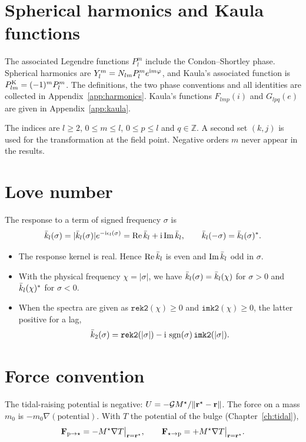 \section{Spherical harmonics and Kaula functions}
The associated Legendre functions $P_l^m$ include the Condon--Shortley phase. Spherical harmonics are $Y_l^m=N_{lm}P_l^me^{\mathrm{i} m\varphi}$, and Kaula's associated function is $P^{\mathrm K}_{lm}=(-1)^mP_l^m$. The definitions, the two phase conventions and all identities are collected in Appendix~\ref{app:harmonics}. Kaula's functions $F_{lmp}(i)$ and $G_{lpq}(e)$ are given in Appendix~\ref{app:kaula}.

The indices are $l\ge2$, $0\le m\le l$, $0\le p\le l$ and $q\in\mathbb Z$. A second set $(k,j)$ is used for the transformation at the field point. Negative orders $m$ never appear in the results.

\section{Love number}
The response to a term of signed frequency $\sigma$ is
\begin{equation}
  \bar k_l(\sigma)=|\bar k_l(\sigma)|e^{-\mathrm{i}\epsilon_l(\sigma)}=\operatorname{Re}\bar k_l+\mathrm{i}\operatorname{Im}\bar k_l,\qquad
  \bar k_l(-\sigma)=\bar k_l(\sigma)^*. \label{eq:love-def}
\end{equation}
\begin{itemize}
  \item The response kernel is real. Hence $\operatorname{Re}\bar k_l$ is even and $\operatorname{Im}\bar k_l$ odd in $\sigma$.
  \item With the physical frequency $\chi=|\sigma|$, we have $\bar k_l(\sigma)=\bar k_l(\chi)$ for $\sigma>0$ and $\bar k_l(\chi)^*$ for $\sigma<0$.
  \item When the spectra are given as $\texttt{rek2}(\chi)\ge0$ and $\texttt{imk2}(\chi)\ge0$, the latter positive for a lag,
  \begin{equation}
    \bar k_2(\sigma)=\texttt{rek2}(|\sigma|)-\mathrm{i}\,\operatorname{sgn}(\sigma)\,\texttt{imk2}(|\sigma|). \label{eq:love-spectra}
  \end{equation}
\end{itemize}

\section{Force convention}
The tidal-raising potential is negative: $U=-\mathcal{G} M^\star/\|\mathbf r^\star-\mathbf r\|$. The force on a mass $m_0$ is $-m_0\nabla(\text{potential})$. With $T$ the potential of the bulge (Chapter~\ref{ch:tidal}),
\begin{equation}
  \mathbf F_{\mathrm p\to\star}=-M^\star\nabla T\big|_{\mathbf r=\mathbf r^\star},\qquad \mathbf F_{\star\to\mathrm p}=+M^\star\nabla T\big|_{\mathbf r=\mathbf r^\star}. \label{eq:force-convention}
\end{equation}


